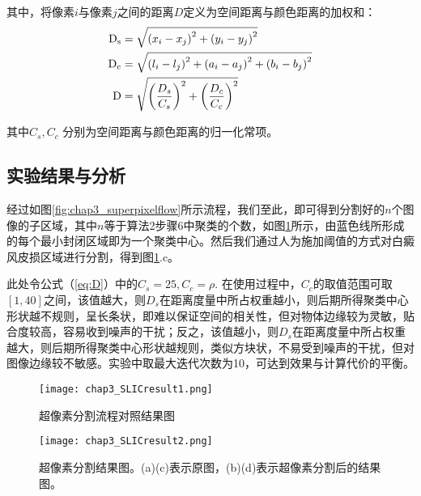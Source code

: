 其中，将像素$i$与像素$j$之间的距离$D$定义为空间距离与颜色距离的加权和：
\begin{subequations}
\begin{align}
\mathrm{D}_{\mathrm{s}}&=\sqrt{\left(x_{i}-x_{j}\right)^{2}+\left(y_{i}-y_{j}\right)^{2}}\\ \vspace{1em}
\mathrm{D}_{\mathrm{c}}&=\sqrt{\left(l_{i}-l_{j}\right)^{2}+\left(a_{i}-a_{j}\right)^{2}+\left(b_{i}-b_{j}\right)^{2}}\\
\mathrm{D}&=\sqrt{\left(\frac{D_{s}}{C_{s}}\right)^{2}+\left(\frac{D_{c}}{C_{c}}\right)^{2}}
\end{align}
\label{eq:D}
\end{subequations}

其中$C_s,C_c$ 分别为空间距离与颜色距离的归一化常项。

\subsection{实验结果与分析}
经过如图\ref{fig:chap3_superpixelflow}所示流程，我们至此，即可得到分割好的$n$个图像的子区域，其中$n$等于算法2步骤6中聚类的个数，如图\ref{fig:chap3_SLICresults1}所示，由蓝色线所形成的每个最小封闭区域即为一个聚类中心。然后我们通过人为施加阈值的方式对白癜风皮损区域进行分割，得到图\ref{fig:chap3_SLICresults1}.c。

此处令公式（\ref{eq:D}）中的$C_s=25,C_c=\rho$. 在使用过程中，$C_c$的取值范围可取$[1,40]$之间，该值越大，则$D_s$在距离度量中所占权重越小，则后期所得聚类中心形状越不规则，呈长条状，即难以保证空间的相关性，但对物体边缘较为灵敏，贴合度较高，容易收到噪声的干扰；反之，该值越小，则$D_s$在距离度量中所占权重越大，则后期所得聚类中心形状越规则，类似方块状，不易受到噪声的干扰，但对图像边缘较不敏感。实验中取最大迭代次数为10，可达到效果与计算代价的平衡。

\begin{figure}[htbp]
\begin{center}
\texttt{[image: chap3\_SLICresult1.png]}
\end{center}
\vspace{-1em}
\caption{超像素分割流程对照结果图}
\label{fig:chap3_SLICresults1}
\end{figure}

\begin{figure}[htbp]
\begin{center}
\texttt{[image: chap3\_SLICresult2.png]}
\end{center}
\vspace{-1em}
\caption{超像素分割结果图。(a)(c)表示原图，(b)(d)表示超像素分割后的结果图。}
\label{fig:chap3_SLICresults2}
\end{figure}

